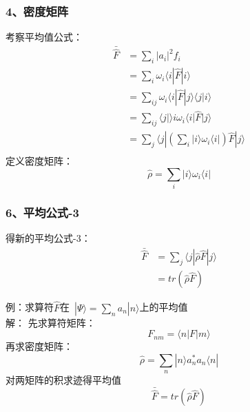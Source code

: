 \begin{frame}
    \frametitle{4、密度矩阵}
    考察平均值公式：\\
    $$ \begin{aligned}
    \bar{\hat{F}} &=\sum\limits_i |a_i|^2 f_i \\
            &=\sum\limits_i \omega_i \langle i |\hat{F}|i \rangle  \\
            &=\sum\limits_{ij} \omega_i \langle i |\hat{F} |j\rangle \langle j| i\rangle  \\
            &=\sum\limits_{ij} \langle j| \rangle i \omega_i \langle i |\hat{F} |j\rangle  \\
            &=\sum\limits_{j} \langle j | (\sum\limits_{i}| i \rangle  \omega_i \langle i |) \hat{F} |j\rangle  \\
    \end{aligned} $$
    定义密度矩阵：
    $$ \hat{\rho} = \sum\limits_{i}| i \rangle  \omega_i \langle i | $$
\end{frame} 
 
\begin{frame}  
    \frametitle{6、平均公式-3}  
    得新的平均公式-3：
    $$ \begin{aligned}
    \bar{\hat{F}}&=\sum\limits_{j} \langle j | \hat{\rho} \hat{F} |j\rangle \\
                &=tr (\hat{\rho} \hat{F} )
    \end{aligned} $$
\end{frame} 
 
\begin{frame}      
    例：求算符$\hat{F}$在 $|\Psi\rangle =\sum\limits_n a_n |n\rangle $上的平均值 \\
    \alert{解：} 先求算符矩阵：
    $$ F_{nm} = \langle n | F |m \rangle  $$
    再求密度矩阵：
    $$ \hat{\rho} = \sum\limits_{n}| n \rangle  a_n ^* a_n \langle n | $$
    对两矩阵的积求迹得平均值
    $$\bar{\hat{F}}=tr (\hat{\rho} \hat{F} )$$
\end{frame} 
 
